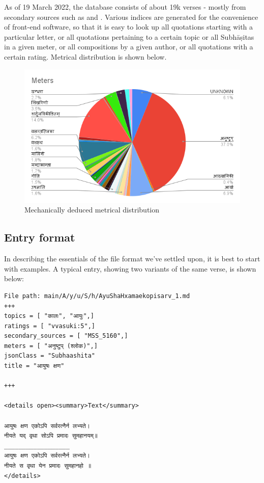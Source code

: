 \documentclass[11pt]{article}
\begin{document}
As of 19 March 2022, the database consists of about 19k verses - mostly from secondary sources such as \cite{subhashita-1952} and \cite{mss-1974}. Various indices are generated for the convenience of front-end software, so that it is easy to look up all quotations starting with a particular letter, or all quotations pertaining to a certain topic or all Subhāṣitas in a given meter, or all compositions by a given author, or all quotations with a certain rating. Metrical distribution is shown below.

\begin{figure}[h]
\caption{Mechanically deduced metrical distribution}
\centering
\includegraphics[width=1.0\textwidth]{Meters}
\end{figure}

\subsection{Entry format}
In describing the essentials of the file format we've settled upon, it is best to start with examples. A typical entry, showing two variants of the same verse, is shown below:

\begin{verbatim}
File path: main/A/y/u/S/h/AyuShaHxamaekopisarv_1.md
+++
topics = [ "कालः", "आयुः",]
ratings = [ "vvasuki:5",]
secondary_sources = [ "MSS_5160",]
meters = [ "अनुष्टुप् (श्लोक)",]
jsonClass = "Subhaashita"
title = "आयुषः क्षण"

+++

<details open><summary>Text</summary>

आयुषः क्षण एकोऽपि सर्वरत्नैर्न लभ्यते।  
नीयते यद् वृथा सोऽपि प्रमादः सुमहानयम्॥
__________________
आयुषः क्षण एकोऽपि सर्वरत्नैर्न लभ्यते।  
नीयते स वृथा येन प्रमादः सुमहानहो ॥
</details>

\end{verbatim}
\end{document}
